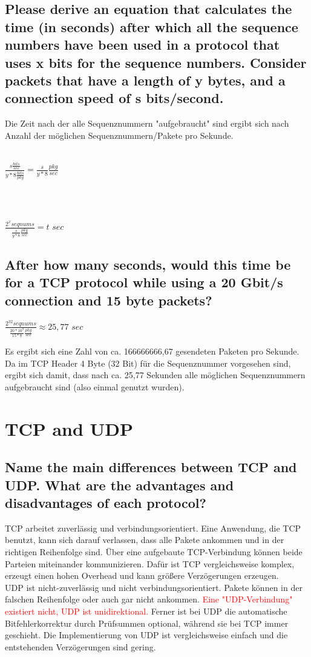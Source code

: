 \documentclass[a4paper,
			llpt,
			solution,
			accentcolor=tud2d,
			colorbacktitle
			]
			{tudexercise}
\begin{document}
\subsection{Please derive an equation that calculates the time (in seconds) after which all the sequence numbers have been used in a protocol that uses x bits for the sequence numbers. Consider packets that have a length of y bytes, and a connection speed of s bits/second.}
Die Zeit nach der alle Sequenznummern "aufgebraucht" sind ergibt sich nach Anzahl der möglichen Sequenznummern/Pakete pro Sekunde.
\\\\
\centerline{
$
    \frac{s \frac{bits}{sec}}{y*8\frac{bits}{pkg}} = \frac{s}{y*8} \frac{pkg}{sec}
$
}
\\
\\

\centerline{
$\frac{2^x seqnums}{\frac{s}{y*8} \frac{pkg}{sec}} = t$ $sec$
}
\subsection{After how many seconds, would this time be for a TCP protocol while using a 20 Gbit/s connection and 15 byte packets?}
\centerline{
$\frac{2^{32} seqnums}{\frac{20*10^9}{15*8} \frac{pkg}{sec}} \approx 25,77$ $sec$
}
Es ergibt sich eine Zahl von ca. 166666666,67 gesendeten Paketen pro Sekunde. Da im TCP Header 4 Byte (32 Bit) für die Sequenznummer vorgesehen sind, ergibt sich damit, dass nach ca. 25,77 Sekunden alle möglichen Sequenznummern aufgebraucht sind (also einmal genutzt wurden).
\section{TCP and UDP}
\subsection{Name the main differences between TCP and UDP. What are the advantages and disadvantages of each protocol?}
TCP arbeitet zuverlässig und verbindungsorientiert. Eine Anwendung, die TCP benutzt, kann sich darauf verlassen, dass alle Pakete ankommen und in der richtigen Reihenfolge sind. Über eine aufgebaute TCP-Verbindung können beide Parteien miteinander kommunizieren. Dafür ist TCP vergleichsweise komplex, erzeugt einen hohen Overhead und kann größere Verzögerungen erzeugen. \\
UDP ist nicht-zuverlässig und nicht verbindungsorientiert. Pakete können in der falschen Reihenfolge oder auch gar nicht ankommen. \textcolor{red}{Eine "UDP-Verbindung" existiert nicht, UDP ist unidirektional.} Ferner ist bei UDP die automatische Bitfehlerkorrektur durch Prüfsummen optional, während sie bei TCP immer geschieht. Die Implementierung von UDP ist vergleichsweise einfach und die entstehenden Verzögerungen sind gering.
\end{document}
